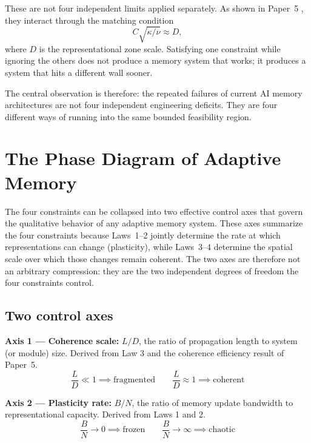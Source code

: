 \documentclass[12pt]{article}
\begin{document}
These are not four independent limits applied separately. As shown in Paper~5 \cite{aubin2026unified}, they interact through the matching condition
\begin{equation}
  C\sqrt{\kappa/\nu} \approx D,
  \label{eq:matching}
\end{equation}
where $D$ is the representational zone scale. Satisfying one constraint while ignoring the others does not produce a memory system that works; it produces a system that hits a different wall sooner.

The central observation is therefore: the repeated failures of current AI memory architectures are not four independent engineering deficits. They are four different ways of running into the same bounded feasibility region.

\section{The Phase Diagram of Adaptive Memory}
\label{sec:phase}

The four constraints can be collapsed into two effective control axes that govern the qualitative behavior of any adaptive memory system. These axes summarize the four constraints because Laws~1--2 jointly determine the rate at which representations can change (plasticity), while Laws~3--4 determine the spatial scale over which those changes remain coherent. The two axes are therefore not an arbitrary compression: they are the two independent degrees of freedom the four constraints control.

\subsection{Two control axes}

\textbf{Axis 1 --- Coherence scale:} $L/D$, the ratio of propagation length to system (or module) size. Derived from Law 3 and the coherence efficiency result of Paper~5.
\begin{equation*}
  \frac{L}{D} \ll 1 \implies \text{fragmented} \qquad \frac{L}{D} \approx 1 \implies \text{coherent}
\end{equation*}

\textbf{Axis 2 --- Plasticity rate:} $B/N$, the ratio of memory update bandwidth to representational capacity. Derived from Laws 1 and 2.
\begin{equation*}
  \frac{B}{N} \to 0 \implies \text{frozen} \qquad \frac{B}{N} \to \infty \implies \text{chaotic}
\end{equation*}
\end{document}
